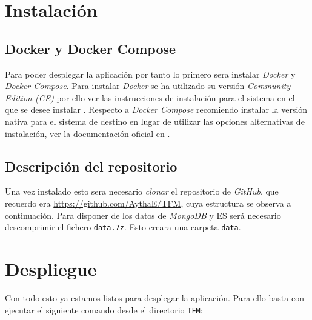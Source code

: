 \section{Instalación}
\subsection{Docker y Docker Compose}
Para poder desplegar la aplicación por tanto lo primero sera instalar \textit{Docker} y \textit{Docker Compose}. Para instalar \textit{Docker} se ha utilizado su versión \textit{Community Edition (CE)} por ello ver las instrucciones de instalación para el sistema en el que se desee instalar \cite{dockerInstall}. Respecto a \textit{Docker Compose} recomiendo instalar la versión nativa para el sistema de destino en lugar de utilizar las opciones alternativas de instalación, ver la documentación oficial en \cite{dockerComposeInstall}.

\newpage

\subsection{Descripción del repositorio}
Una vez instalado esto sera necesario \textit{clonar} el repositorio de \textit{GitHub}, que recuerdo era \url{https://github.com/AythaE/TFM}, cuya estructura se observa a continuación. Para disponer de los datos de \textit{MongoDB} y \acrlong{ES} será necesario descomprimir el fichero \texttt{data.7z}. Esto creara una carpeta \texttt{data}.


\section{Despliegue}
Con todo esto ya estamos listos para desplegar la aplicación. Para ello basta con ejecutar el siguiente comando desde el directorio \texttt{TFM}:

